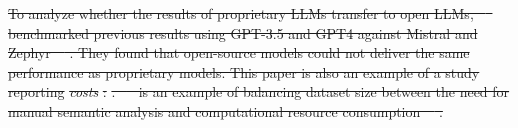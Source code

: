 \documentclass[smallextended]{svjour3}
\providecommand{\DIFdeltex}[1]{{\protect\color{red}\sout{#1}}}                      %
\providecommand{\DIFdel}[1]{\texorpdfstring{\DIFdeltex{#1}}{}} %
\begin{document}
\DIFdel{To analyze whether the results of proprietary LLMs transfer to open LLMs, \mbox{%
\citeauthor{DBLP:conf/sigir-ap/StaudingerKPLH24} }\hskip0pt%
benchmarked previous results using GPT-3.5 and GPT4 against Mistral and Zephyr~\mbox{%
\cite{DBLP:conf/sigir-ap/StaudingerKPLH24}}\hskip0pt%
.
They found that open-source models could not deliver the same performance as proprietary models. This paper is also an example of a study reporting }\emph{\DIFdel{costs}}%
\DIFdel{: }%
\DIFdel{.
\mbox{%
\citeauthor{tinnessoftware} }\hskip0pt%
is an example of balancing dataset size between the need for manual semantic analysis and computational resource consumption~\mbox{%
\cite{tinnessoftware}}\hskip0pt%
.
}%
\end{document}
